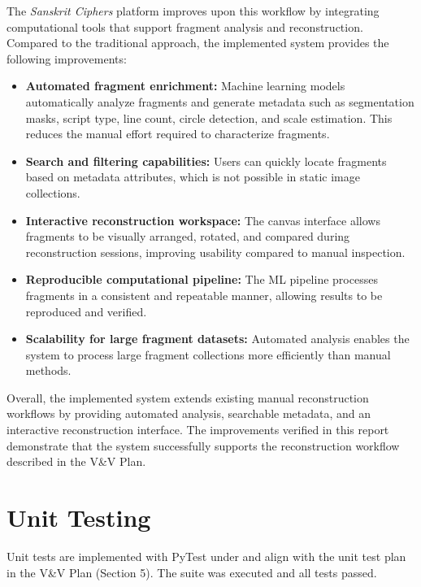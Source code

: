 \documentclass[12pt, titlepage]{article}
\begin{document}
The \textit{Sanskrit Ciphers} platform improves upon this workflow by integrating computational tools that support fragment analysis and reconstruction. Compared to the traditional approach, the implemented system provides the following improvements:

\begin{itemize}
\item \textbf{Automated fragment enrichment:} Machine learning models automatically analyze fragments and generate metadata such as segmentation masks, script type, line count, circle detection, and scale estimation. This reduces the manual effort required to characterize fragments.

\item \textbf{Search and filtering capabilities:} Users can quickly locate fragments based on metadata attributes, which is not possible in static image collections.

\item \textbf{Interactive reconstruction workspace:} The canvas interface allows fragments to be visually arranged, rotated, and compared during reconstruction sessions, improving usability compared to manual inspection.

\item \textbf{Reproducible computational pipeline:} The ML pipeline processes fragments in a consistent and repeatable manner, allowing results to be reproduced and verified.

\item \textbf{Scalability for large fragment datasets:} Automated analysis enables the system to process large fragment collections more efficiently than manual methods.
\end{itemize}

Overall, the implemented system extends existing manual reconstruction workflows by providing automated analysis, searchable metadata, and an interactive reconstruction interface. The improvements verified in this report demonstrate that the system successfully supports the reconstruction workflow described in the V\&V Plan.

\section{Unit Testing}

Unit tests are implemented with PyTest under  and align with the unit test plan in the V\&V Plan (Section 5). The suite was executed and all tests passed.
\end{document}
